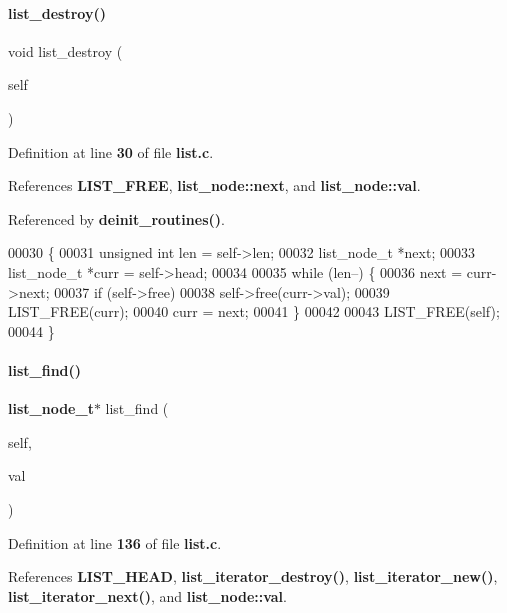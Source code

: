\paragraph{list\+\_\+destroy()}
{\footnotesize\ttfamily void list\+\_\+destroy (\begin{DoxyParamCaption}\item[{\textbf{ list\+\_\+t} $\ast$}]{self }\end{DoxyParamCaption})}



Definition at line \textbf{ 30} of file \textbf{ list.\+c}.



References \textbf{ L\+I\+S\+T\+\_\+\+F\+R\+EE}, \textbf{ list\+\_\+node\+::next}, and \textbf{ list\+\_\+node\+::val}.



Referenced by \textbf{ deinit\+\_\+routines()}.


\begin{DoxyCode}
00030                                 \{
00031   \textcolor{keywordtype}{unsigned} \textcolor{keywordtype}{int} len = \textcolor{keyword}{self}->len;
00032   list_node_t *next;
00033   list_node_t *curr = \textcolor{keyword}{self}->head;
00034 
00035   \textcolor{keywordflow}{while} (len--) \{
00036     next = curr->next;
00037     \textcolor{keywordflow}{if} (self->free)
00038       \textcolor{keyword}{self}->free(curr->val);
00039     LIST_FREE(curr);
00040     curr = next;
00041   \}
00042 
00043   LIST_FREE(\textcolor{keyword}{self});
00044 \}
\end{DoxyCode}
\mbox{\label{a00029_a5d73352b7bfa0c5a8b33289d7b27a374}} 
\paragraph{list\+\_\+find()}
{\footnotesize\ttfamily \textbf{ list\+\_\+node\+\_\+t}$\ast$ list\+\_\+find (\begin{DoxyParamCaption}\item[{\textbf{ list\+\_\+t} $\ast$}]{self,  }\item[{void $\ast$}]{val }\end{DoxyParamCaption})}



Definition at line \textbf{ 136} of file \textbf{ list.\+c}.



References \textbf{ L\+I\+S\+T\+\_\+\+H\+E\+AD}, \textbf{ list\+\_\+iterator\+\_\+destroy()}, \textbf{ list\+\_\+iterator\+\_\+new()}, \textbf{ list\+\_\+iterator\+\_\+next()}, and \textbf{ list\+\_\+node\+::val}.


